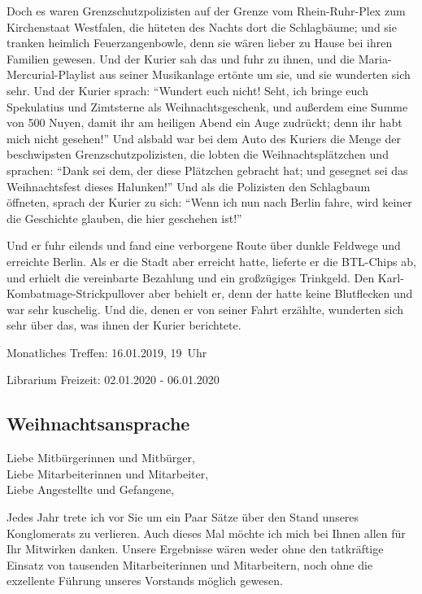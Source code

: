 Doch es waren Grenzschutzpolizisten auf der Grenze vom Rhein-Ruhr-Plex zum Kirchenstaat Westfalen, die hüteten des Nachts dort die Schlagbäume; und sie tranken heimlich Feuerzangenbowle, denn sie wären lieber zu Hause bei ihren Familien gewesen.
Und der Kurier sah das und fuhr zu ihnen, und die Maria-Mercurial-Playlist aus seiner Musikanlage ertönte um sie, und sie wunderten sich sehr.
Und der Kurier sprach: \enquote{Wundert euch nicht! Seht, ich bringe euch Spekulatius und Zimtsterne als Weihnachtsgeschenk, und außerdem eine Summe von 500 Nuyen, damit ihr am heiligen Abend ein Auge zudrückt; denn ihr habt mich nicht gesehen!}
Und alsbald war bei dem Auto des Kuriers die Menge der beschwipsten Grenzschutzpolizisten, die lobten die Weihnachtsplätzchen und sprachen:
\enquote{Dank sei dem, der diese Plätzchen gebracht hat; und gesegnet sei das Weihnachtsfest dieses Halunken!}
Und als die Polizisten den Schlagbaum öffneten, sprach der Kurier zu sich:
\enquote{Wenn ich nun nach Berlin fahre, wird keiner die Geschichte glauben, die hier geschehen ist!}

Und er fuhr eilends und fand eine verborgene Route über dunkle Feldwege und erreichte Berlin.
Als er die Stadt aber erreicht hatte, lieferte er die BTL-Chips ab, und erhielt die vereinbarte Bezahlung und ein großzügiges Trinkgeld.
Den Karl-Kombatmage-Strickpullover aber behielt er, denn der hatte keine Blutflecken und war sehr kuschelig.
Und die, denen er von seiner Fahrt erzählte, wunderten sich sehr über das, was ihnen der Kurier berichtete.

\begin{termineOhneImpressum}
  \item Monatliches Treffen: 16.01.2019, 19~Uhr
  \item Librarium Freizeit: 02.01.2020 - 06.01.2020
\end{termineOhneImpressum}

\subsection{Weihnachtsansprache }
Liebe Mitbürgerinnen und Mitbürger,\\
Liebe Mitarbeiterinnen und Mitarbeiter,\\
Liebe Angestellte und Gefangene,

Jedes Jahr trete ich vor Sie um ein Paar Sätze über den Stand unseres
Konglomerats zu verlieren. Auch dieses Mal möchte ich mich bei Ihnen
allen für Ihr Mitwirken danken. Unsere Ergebnisse wären weder ohne den
tatkräftige Einsatz von tausenden Mitarbeiterinnen und Mitarbeitern, noch
ohne die exzellente Führung unseres Vorstands möglich gewesen.

